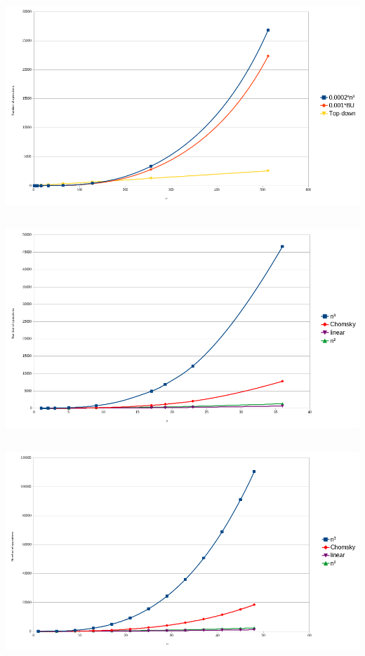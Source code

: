 \documentclass[twocolumn]{article}
\begin{document}
\subsection{ }
\begin{center}
  \label{fig:as}
  \includegraphics[width=\textwidth]{as/as}
\end{center}

\newpage
\subsection{ }
\begin{center}
  \label{fig:complexity_as_bs_cs}
  \includegraphics[width=\textwidth]{linear/complexity_as_bs_cs}
\end{center}

\newpage
\subsection{ }
\begin{center}
  \label{fig:complexity_random_abc}
  \includegraphics[width=\textwidth]{linear/complexity_random_abc}
\end{center}
\end{document}
